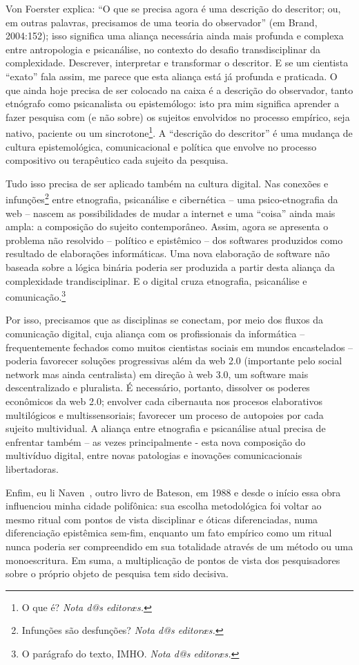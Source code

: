 \documentclass[a4paper, 12pt]{article} %
\makeatletter
\newcommand{\ftnt}[1]{\footnote{#1 \emph{Nota d@s editoræs.}}}
\makeatother
\begin{document}
Von Foerster explica: “O que se precisa agora é uma descrição do descritor; ou, em outras palavras, precisamos de uma teoria do observador” (em Brand, 2004:152); isso significa uma aliança necessária ainda mais profunda e complexa entre antropologia e psicanálise, no contexto do desafio  transdisciplinar da complexidade. Descrever, interpretar e transformar o descritor. E se um cientista “exato” fala assim, me parece que esta aliança está já profunda e praticada. O que ainda hoje precisa de ser colocado na caixa é a descrição do observador, tanto etnógrafo como psicanalista ou epistemólogo: isto pra mim significa aprender a fazer pesquisa com (e não sobre) os sujeitos envolvidos no processo empírico, seja nativo, paciente ou um sincrotone\ftnt{O que é?}. A “descrição do descritor” é uma mudança de cultura epistemológica, comunicacional e política que envolve no processo compositivo ou terapêutico cada sujeito da pesquisa. 

Tudo isso precisa de ser aplicado também na cultura digital.  Nas conexões  e infunções\ftnt{Infunções são desfunções?} entre etnografia, psicanálise e cibernética – uma psico-etnografia da web – nascem as possibilidades de mudar a internet e uma “coisa” ainda mais ampla: a composição do sujeito contemporâneo. Assim, agora se apresenta o problema não resolvido – político e epistêmico – dos softwares produzidos como resultado de elaborações informáticas. Uma nova elaboração de software não baseada sobre a lógica binária poderia ser produzida a partir desta aliança da complexidade trandisciplinar. E o digital cruza etnografia, psicanálise e comunicação.\ftnt{O parágrafo do texto, IMHO.}

Por isso, precisamos que as disciplinas se conectam, por meio dos fluxos da comunicação digital, cuja aliança com os profissionais da informática – frequentemente fechados como muitos cientistas sociais em mundos encastelados – poderia favorecer soluções progressivas além da web 2.0 (importante pelo social network mas ainda centralista) em direção à web 3.0, um software  mais descentralizado e pluralista. É necessário, portanto, dissolver os poderes econômicos da web 2.0; envolver cada cibernauta nos procesos elaborativos multilógicos e multissensoriais; favorecer um proceso de autopoies por cada sujeito multividual. A aliança entre etnografia e psicanálise atual precisa de enfrentar também – as vezes principalmente  - esta nova composição do multivíduo digital, entre novas patologias e inovações comunicacionais libertadoras.

Enfim, eu li Naven~\cite{b7}, outro livro de Bateson, em 1988 e desde o início essa obra influenciou minha cidade polifônica: sua escolha metodológica foi voltar ao mesmo ritual com pontos de vista disciplinar e óticas diferenciadas, numa diferenciação epistêmica sem-fim, enquanto um fato empírico como um ritual nunca poderia ser compreendido em sua totalidade através de um método ou uma monoescritura. Em suma, a multiplicação de pontos de vista dos pesquisadores sobre o próprio objeto de pesquisa tem sido decisiva. 
\end{document}
